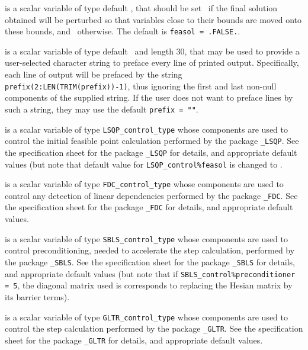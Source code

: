 \begin{description}
 is a scalar variable of type default \logical, that
should be set \true\
if the final solution obtained will be perturbed
so that variables close to their bounds are moved onto these bounds,
and \false\ otherwise.
The default is {\tt feasol = .FALSE.}.


 is a scalar variable of type default \character\
and length 30, that may be used to provide a user-selected
character string to preface every line of printed output.
Specifically, each line of output will be prefaced by the string
{\tt prefix(2:LEN(TRIM(prefix))-1)},
thus ignoring the first and last non-null components of the
supplied string. If the user does not want to preface lines by such
a string, they may use the default {\tt prefix = ""}.

 is a scalar variable of type
{\tt LSQP\_control\_type}
whose components are used to control the initial feasible point calculation
performed by the package
{\tt \libraryname\_LSQP}.
See the specification sheet for the package
{\tt \libraryname\_LSQP}
for details, and appropriate default values (but note that default value for
{\tt LSQP\_control\%feasol} is changed to \false.

 is a scalar variable of type
{\tt FDC\_control\_type}
whose components are used to control any detection of linear dependencies
performed by the package
{\tt \libraryname\_FDC}.
See the specification sheet for the package
{\tt \libraryname\_FDC}
for details, and appropriate default values.

 is a scalar variable of type
{\tt SBLS\_control\_type}
whose components are used to control preconditioning, needed to accelerate
the step calculation,
performed by the package
{\tt \libraryname\_SBLS}.
See the specification sheet for the package
{\tt \libraryname\_SBLS}
for details, and appropriate default values (but note that if
{\tt SBLS\_control\%preconditioner = 5}, the diagonal matrix used is
corresponds to replacing the Hesian matrix by its barrier terms).

\itt{GLTR\_control} is a scalar variable of type
{\tt GLTR\_control\_type}
whose components are used to control the step calculation
performed by the package
{\tt \libraryname\_GLTR}.
See the specification sheet for the package
{\tt \libraryname\_GLTR}
for details, and appropriate default values.

\end{description}
